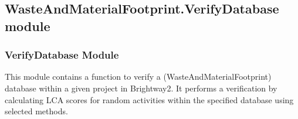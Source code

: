 \documentclass[letterpaper,10pt,english]{sphinxmanual}
\begin{document}
\subsection{WasteAndMaterialFootprint.VerifyDatabase module}
\label{\detokenize{WMFootprint_api:module-WasteAndMaterialFootprint.VerifyDatabase}}\label{\detokenize{WMFootprint_api:wasteandmaterialfootprint-verifydatabase-module}}

\subsubsection{VerifyDatabase Module}
\label{\detokenize{WMFootprint_api:verifydatabase-module}}
\sphinxAtStartPar
This module contains a function to verify a (WasteAndMaterialFootprint) database 
within a given project in Brightway2. It performs a verification by calculating LCA scores 
for random activities within the specified database using selected methods.
\end{document}
